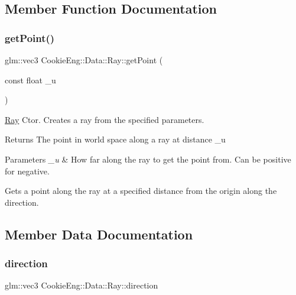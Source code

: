 \subsection{Member Function Documentation}
\mbox{\label{struct_cookie_eng_1_1_data_1_1_ray_a2681dc85c2d445e36a77bd623d125fb8}} 
\subsubsection{\texorpdfstring{get\+Point()}{getPoint()}}
{\footnotesize\ttfamily glm\+::vec3 Cookie\+Eng\+::\+Data\+::\+Ray\+::get\+Point (\begin{DoxyParamCaption}\item[{const float}]{\+\_\+u }\end{DoxyParamCaption})}



\hyperlink{struct_cookie_eng_1_1_data_1_1_ray}{Ray} Ctor. Creates a ray from the specified parameters. 

\begin{DoxyReturn}{Returns}
The point in world space along a ray at distance \+\_\+u 
\end{DoxyReturn}

\begin{DoxyParams}{Parameters}
{\em \+\_\+u} & How far along the ray to get the point from. Can be positive for negative.\\
\hline
\end{DoxyParams}
Gets a point along the ray at a specified distance from the origin along the direction. 

\subsection{Member Data Documentation}
\mbox{\label{struct_cookie_eng_1_1_data_1_1_ray_aa245307862a93851ec6bc93ec23ee829}} 
\subsubsection{\texorpdfstring{direction}{direction}}
{\footnotesize\ttfamily glm\+::vec3 Cookie\+Eng\+::\+Data\+::\+Ray\+::direction}

